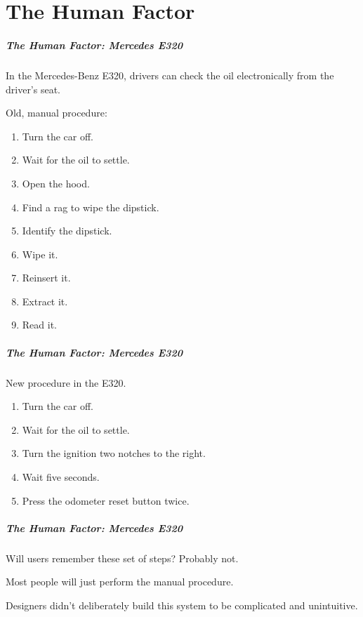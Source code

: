 \part{The Human Factor}
\frame{\partpage}

\begin{frame}
\frametitle{The Human Factor: Mercedes E320}
\begin{changemargin}{1cm}
In the Mercedes-Benz E320, drivers can check the oil electronically from the driver's seat. 

Old, manual procedure:
\begin{enumerate}
	\item Turn the car off.
	\item Wait for the oil to settle.
	\item Open the hood.
	\item Find a rag to wipe the dipstick.
	\item Identify the dipstick.
	\item Wipe it.
	\item Reinsert it.
	\item Extract it.
	\item Read it.
\end{enumerate}
\end{changemargin}
\end{frame}

\begin{frame}
\frametitle{The Human Factor: Mercedes E320}
\begin{changemargin}{1cm}
New procedure in the E320.
\begin{enumerate}
	\item Turn the car off.
	\item Wait for the oil to settle.
	\item Turn the ignition two notches to the right.
	\item Wait five seconds.
	\item Press the odometer reset button twice.
\end{enumerate}
\end{changemargin}
\end{frame}

\begin{frame}
\frametitle{The Human Factor: Mercedes E320}
\begin{changemargin}{1cm}
Will users remember these set of steps? Probably not. 

Most people will just perform the manual procedure. 

Designers didn't deliberately build this system to be complicated and unintuitive.

\end{changemargin}
\end{frame}

